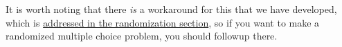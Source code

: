 \documentclass{ximera}
\begin{document}
            It is worth noting that there \textit{is} a workaround for this that we have developed, which is \href{https://xronos.clas.ufl.edu/examples/exampleCore/problemDesign/multipleChoice}{addressed in the randomization section}, so if you want to make a randomized multiple choice problem, you should followup there.
            
        
    
\end{document}
